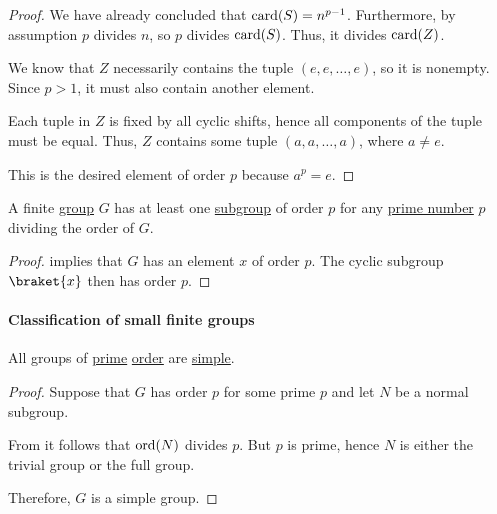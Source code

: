 \begin{proof}
  We have already concluded that \( \operatorname{card}(S) = n^{p-1} \). Furthermore, by assumption \( p \) divides \( n \), so \( p \) divides \( \operatorname{card}(S) \). Thus, it divides \( \operatorname{card}(Z) \).

  We know that \( Z \) necessarily contains the tuple \( (e, e, \ldots, e) \), so it is nonempty. Since \( p > 1 \), it must also contain another element.

  Each tuple in \( Z \) is fixed by all cyclic shifts, hence all components of the tuple must be equal. Thus, \( Z \) contains some tuple \( (a, a, \ldots, a) \), where \( a \neq e \).

  This is the desired element of order \( p \) because \( a^p = e \).
\end{proof}

\begin{corollary}\label{thm:weak_cauchys_subgroup_theorem}
  A finite \hyperref[def:group]{group} \( G \) has at least one \hyperref[def:group/submodel]{subgroup} of order \( p \) for any \hyperref[def:prime_number]{prime number} \( p \) dividing the order of \( G \).
\end{corollary}
\begin{proof}
   implies that \( G \) has an element \( x \) of order \( p \). The cyclic subgroup \( \braket{ x } \) then has order \( p \).
\end{proof}

\paragraph{Classification of small finite groups}

\begin{proposition}\label{thm:prime_groups_are_simple}
  All groups of \hyperref[def:prime_number]{prime} \hyperref[def:group_order]{order} are \hyperref[def:simple_object]{simple}.
\end{proposition}
\begin{proof}
  Suppose that \( G \) has order \( p \) for some prime \( p \) and let \( N \) be a normal subgroup.

  From  it follows that \( \operatorname{ord}(N) \) divides \( p \). But \( p \) is prime, hence \( N \) is either the trivial group or the full group.

  Therefore, \( G \) is a simple group.
\end{proof}


